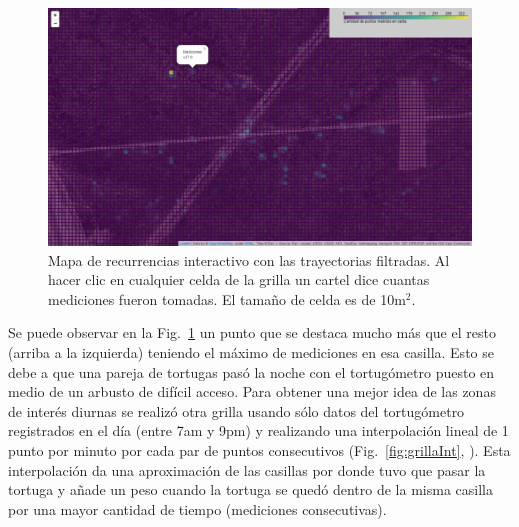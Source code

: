  
\begin{figure}[ht]
    \begin{center}
    \includegraphics[width=\imsize]{Chap2/GrillaSintCNoche.png}
    \end{center}
    \caption[Mapa de zonas de recurrencia.]{Mapa de recurrencias  interactivo con las trayectorias filtradas. Al hacer clic en cualquier celda de la grilla un cartel dice cuantas mediciones fueron tomadas. El tamaño de celda es de 10m$^2$.}
    \label{fig:grilla1}
\end{figure}
 
Se puede observar en la Fig.~\ref{fig:grilla1} un punto que se destaca mucho más que el resto (arriba a la izquierda) teniendo el máximo de mediciones en esa casilla. Esto se debe a que una pareja de tortugas pasó la noche con el tortugómetro puesto en medio de un arbusto de difícil acceso. Para obtener una mejor idea de las zonas de interés diurnas se realizó otra grilla usando sólo datos del tortugómetro registrados en el día (entre 7am y 9pm) y  realizando una interpolación lineal de 1 punto por minuto por cada par de puntos consecutivos (Fig.~\ref{fig:grillaInt}, \cite{github}). Esta interpolación da una aproximación de las casillas por donde tuvo que pasar la tortuga y añade un peso cuando la tortuga se quedó dentro de la misma casilla por una mayor cantidad de tiempo (mediciones consecutivas).
 
